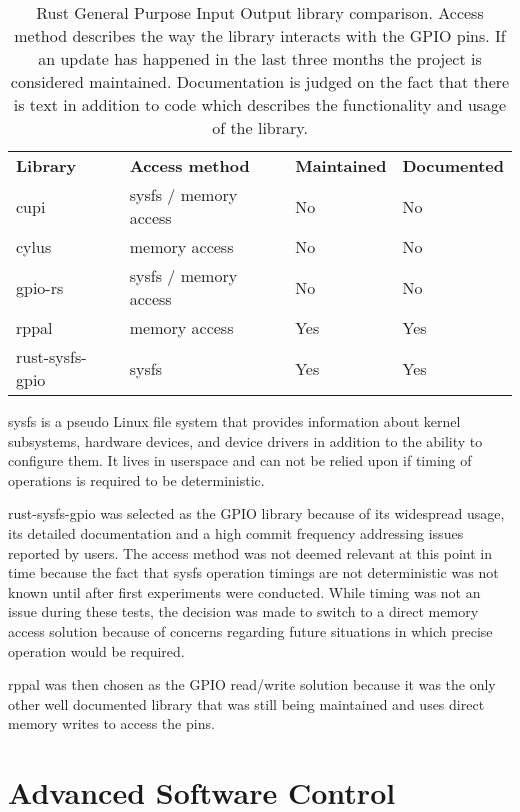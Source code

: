 \begin{table}[H]
\centering
\begin{tabular}{llll}
\textbf{Library} & \textbf{Access method} & \textbf{Maintained} & \textbf{Documented} \\
cupi             & sysfs / memory access  & No                  & No                  \\
cylus            & memory access          & No                  & No                  \\
gpio-rs          & sysfs / memory access  & No                  & No                  \\
rppal            & memory access          & Yes                 & Yes                 \\
rust-sysfs-gpio  & sysfs                  & Yes                 & Yes
\end{tabular}
\caption{Rust General Purpose Input Output library comparison. Access method describes the way the library interacts with the GPIO pins. If an update has happened in the last three months the project is considered maintained. Documentation is judged on the fact that there is text in addition to code which describes the functionality and usage of the library.}
\end{table}

sysfs is a pseudo Linux file system that provides information about kernel subsystems, hardware devices, and device drivers in addition to the ability to configure them. It lives in userspace and can not be relied upon if timing of operations is required to be deterministic. 

rust-sysfs-gpio \cite{rust-sysfs-gpio} was selected as the GPIO library because of its widespread usage, its detailed documentation and a high commit frequency addressing issues reported by users. The access method was not deemed relevant at this point in time because the fact that sysfs operation timings are not deterministic was not known until after first experiments were conducted. While timing was not an issue during these tests, the decision was made to switch to a direct memory access solution because of concerns regarding future situations in which precise operation would be required. 

rppal \cite{rppal} was then chosen as the GPIO read/write solution because it was the only other well documented library that was still being maintained and uses direct memory writes to access the pins.


\section{Advanced Software Control}
